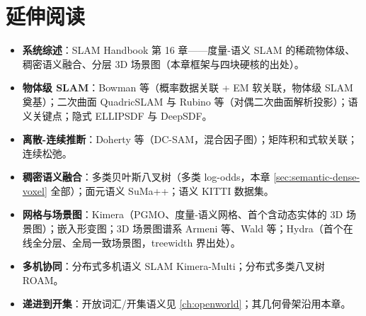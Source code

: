 \section*{延伸阅读}
\begin{itemize}
  \item \textbf{系统综述}：SLAM Handbook\cite{carlone2026handbook} 第 16 章——度量-语义 SLAM 的稀疏物体级、稠密语义融合、分层 3D 场景图（本章框架与四块硬核的出处）。
  \item \textbf{物体级 SLAM}：Bowman 等\cite{bowman2017probabilistic}（概率数据关联 + EM 软关联，物体级 SLAM 奠基）；二次曲面 QuadricSLAM\cite{nicholson2019quadricslam} 与 Rubino 等\cite{rubino2018quadrics}（对偶二次曲面解析投影）；语义关键点\cite{pavlakos2017semantickeypoints}；隐式 ELLIPSDF\cite{wang2021ellipsdf} 与 DeepSDF\cite{park2019deepsdf}。
  \item \textbf{离散-连续推断}：Doherty 等\cite{doherty2022discrete}（DC-SAM，混合因子图）；矩阵积和式软关联\cite{atanasov2016localization}；连续松弛\cite{sunderhauf2016dual}。
  \item \textbf{稠密语义融合}：多类贝叶斯八叉树\cite{asgharivaskasi2023semantic}（多类 log-odds，本章 \cref{sec:semantic-dense-voxel} 全部）；面元语义 SuMa++\cite{chen2019suma++}；语义 KITTI 数据集\cite{behley2019semantickitti}。
  \item \textbf{网格与场景图}：Kimera\cite{rosinol2021kimera}（PGMO、度量-语义网格、首个含动态实体的 3D 场景图）；嵌入形变图\cite{sumner2007embedded}；3D 场景图谱系 Armeni 等\cite{armeni2019scenegraph}、Wald 等\cite{wald2020scenegraph}；Hydra\cite{hughes2022hydra}（首个在线全分层、全局一致场景图，treewidth 界出处）。
  \item \textbf{多机协同}：分布式多机语义 SLAM Kimera-Multi\cite{tian2022kimeramulti}；分布式多类八叉树 ROAM\cite{asgharivaskasi2023roam}。
  \item \textbf{递进到开集}：开放词汇/开集语义见 \cref{ch:openworld}；其几何骨架沿用本章。
\end{itemize}

